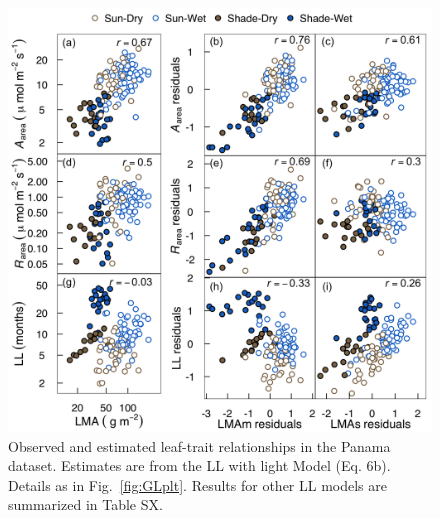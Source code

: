 \documentclass[
  12pt,
]{article}
\providecommand{\DIFaddbeginFL}{} %
\providecommand{\DIFaddendFL}{} %
\providecommand{\DIFdelbeginFL}{} %
\providecommand{\DIFdelendFL}{} %
\newcommand{\DIFscaledelfig}{0.5}
\newlength{\DIFdelgraphicswidth} %
\newlength{\DIFdelgraphicsheight} %
\newcommand{\DIFaddincludegraphics}[2][]{{\color{blue}\fbox{\DIFOincludegraphics[#1]{#2}}}} %
\newcommand{\DIFdelincludegraphics}[2][]{%
\sbox{\DIFdelgraphicsbox}{\DIFOincludegraphics[#1]{#2}}%
\settoboxwidth{\DIFdelgraphicswidth}{\DIFdelgraphicsbox} %
\settoboxtotalheight{\DIFdelgraphicsheight}{\DIFdelgraphicsbox} %
\scalebox{\DIFscaledelfig}{%
\parbox[b]{\DIFdelgraphicswidth}{\usebox{\DIFdelgraphicsbox}\\[-\baselineskip] \rule{\DIFdelgraphicswidth}{0em}}\llap{\resizebox{\DIFdelgraphicswidth}{\DIFdelgraphicsheight}{%
\setlength{\unitlength}{\DIFdelgraphicswidth}%
\begin{picture}(1,1)%
\thicklines\linethickness{2pt} %
{\color[rgb]{1,0,0}\put(0,0){\framebox(1,1){}}}%
{\color[rgb]{1,0,0}\put(0,0){\line( 1,1){1}}}%
{\color[rgb]{1,0,0}\put(0,1){\line(1,-1){1}}}%
\end{picture}%
}\hspace*{3pt}}} %
} %
\DeclareRobustCommand{\DIFaddbeginFL}{\DIFOaddbeginFL \let\includegraphics\DIFaddincludegraphics} %
\DeclareRobustCommand{\DIFaddendFL}{\DIFOaddendFL \let\includegraphics\DIFOincludegraphics} %
\DeclareRobustCommand{\DIFdelbeginFL}{\DIFOdelbeginFL \let\includegraphics\DIFdelincludegraphics} %
\DeclareRobustCommand{\DIFdelendFL}{\DIFOaddendFL \let\includegraphics\DIFOincludegraphics} %
\begin{document}
\newpage

\begin{figure}
\DIFdelbeginFL %
\DIFdelendFL \DIFaddbeginFL \hypertarget{fig:PAplt}{%
\centering
\includegraphics{../figs/PA_3.png}
\caption{Observed and estimated leaf-trait relationships in the Panama dataset.
Estimates are from the LL with light Model (Eq. 6b).
Details as in Fig.~\ref{fig:GLplt}.
Results for other LL models are summarized in Table SX.}\label{fig:PAplt}
}
\DIFaddendFL \end{figure}

\newpage
\end{document}
